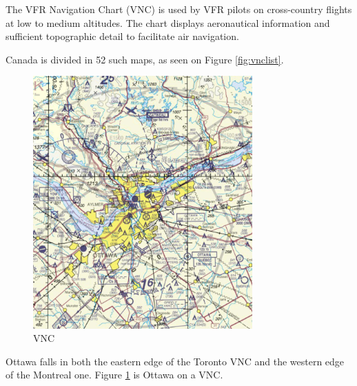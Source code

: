 \documentclass[12pt,letterpaper]{article}
\begin{document}
        The VFR Navigation Chart (VNC) is used by VFR pilots on cross-country flights at low to medium altitudes. The chart displays aeronautical information and sufficient topographic detail to facilitate air navigation. 

        Canada is divided in 52 such maps, as seen on Figure \ref{fig:vnclist}.
        
        \begin{figure}
            \centering
            \includegraphics[width=0.75\textwidth]{vnc.jpeg}
            \caption{VNC}
            \label{fig:vnc}
        \end{figure}

        Ottawa falls in both the eastern edge of the Toronto VNC and the western edge of the Montreal one. Figure \ref{fig:vnc} is Ottawa on a VNC.
        
\end{document}

